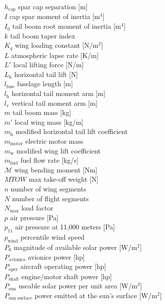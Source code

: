 \documentclass[]{aiaa-tc}%
\begin{document}
\begin{multicols}{2}
\begin{tabbing}
$h_{\text{cap}}$ \> spar cap separation [m] \\
$I$ \> cap spar moment of inertia [m$^4$] \\
$I_0$ \> tail boom root moment of inertia [m$^4$] \\
$k$ \> tail boom taper index \\
$K_q$ \> wing loading constant [N/m$^2$] \\
$L$ \> atmospheric lapse rate [K/m] \\
$L'$ \> local lifting force [N/m] \\
$L_\text{h}$ \> horizontal tail lift [N] \\
$l_\text{fuse}$ \> fuselage length [m] \\
$l_\text{h}$ \> horizontal tail moment arm [m] \\
$l_\text{v}$ \> vertical tail moment arm [m] \\
$m$ \> tail boom mass [kg] \\
$m'$ \> local wing mass [kg/m] \\
$m_{\text{h}}$ \> modified horizontal tail lift coefficient \\
$m_{\text{motor}}$ \> electric motor mass \\
$m_{\text{w}}$ \> modified wing lift coefficient \\
$\dot{m}_{\text{fuel}}$ \> fuel flow rate [kg/s] \\
$\mathcal{M}$ \> wing bending moment [Nm] \\
$MTOW$ \> max take-off weight [N] \\
$n$ \> number of wing segments \\
$N$ \> number of flight segments \\
$N_{\text{max}}$ \> load factor\\
$p$ \> air pressure [Pa]\\
$p_{11}$ \> air pressure at 11,000 meters [Pa]\\
$p_{\text{wind}}$ \> percentile wind speed \\
$P_{0}$ \> magnitude of available solar power [W/m$^2$] \\
$P_{\text{avionics}}$ \> avionics power [hp] \\
$P_{\text{oper}}$ \> aircraft operating power [hp] \\
$P_{\text{shaft}}$ \> engine/motor shaft power [hp] \\
$P_{\text{sun}}$ \> useable solar power per unit area [W/m$^2$] \\
$P_{\text{sun surface}}$ \> power emitted at the sun's surface [W/m$^2$] \\

\end{tabbing}
\end{multicols}
\end{document}
